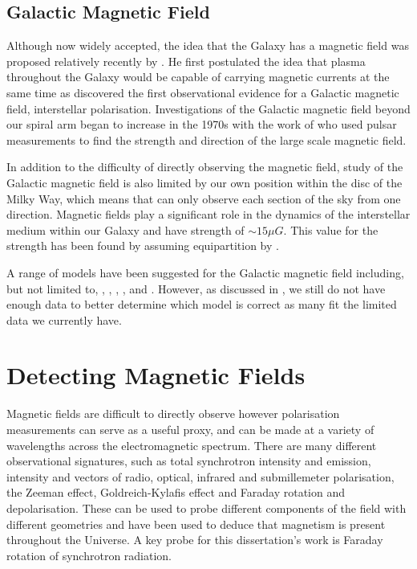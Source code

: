 \subsection{Galactic Magnetic Field}

Although now widely accepted, the idea that the Galaxy has a magnetic field was proposed relatively recently by \cite{Alfven}. He first postulated the idea that plasma throughout the Galaxy would be capable of carrying magnetic currents at the same time as \cite{Hiltner} discovered the first observational evidence for a Galactic magnetic field,  interstellar polarisation. Investigations of the Galactic magnetic field beyond our spiral arm began to increase in the 1970s with the work of \cite{Ruzmaikin_and_Sokolov_1977} who used pulsar measurements to find the strength and direction of the large scale magnetic field.

In addition to the difficulty of directly observing the magnetic field, study of the Galactic magnetic field is also limited by our own position within the disc of the Milky Way, which means that can only observe each section of the sky from one direction. Magnetic fields play a significant role in the dynamics of the interstellar medium within our Galaxy and have strength of $\sim 15\mu G$. This value for the strength has been found by assuming equipartition by \cite{Beck_Bfield_Rev_2015}. 

A range of models have been suggested for the Galactic magnetic field including, but not limited to, \cite{Shukurov_2019}, \cite{Jansson_2012}, \cite{Sun_2010}, \cite{Fauvet_2011}, \cite{Van_Eck_2011} and \cite{Tinyakov_2002}. However, as discussed in \cite{Planck_2016}, we still do not have enough data to better determine which model is correct as many fit the limited data we currently have. 




\section{Detecting Magnetic Fields}

Magnetic fields are difficult to directly observe however polarisation measurements can serve as a useful proxy, and can be made at a variety of wavelengths across the electromagnetic spectrum. There are many different observational signatures, such as total synchrotron intensity and emission, intensity and vectors of radio, optical, infrared and submillemeter polarisation, the Zeeman effect, Goldreich-Kylafis effect and Faraday rotation and depolarisation. These  can be used to probe different components of the field with different geometries and have been used to deduce that magnetism is present throughout the Universe. A key probe for this dissertation's work is Faraday rotation of synchrotron radiation.


